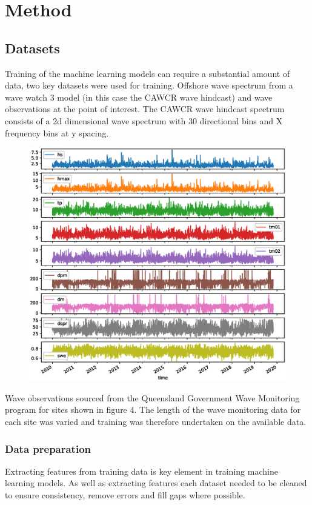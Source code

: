 \documentclass[a4paper,fleqn]{cas-sc}
\begin{document}
\section{Method}\label{method}

\subsection{Datasets}
Training of the machine learning models can require a substantial amount of data, two key datasets were used for training. Offshore wave spectrum from a wave watch 3 model (in this case the CAWCR wave hindcast) and wave observations at the point of interest. The CAWCR wave hindcast spectrum consists of a 2d dimensional wave spectrum with 30 directional bins and X frequency bins at y spacing.

\begin{figure}
	\centering
		\includegraphics{"offshore_modelled.eps"}
	  \caption{}\label{fig1}
\end{figure}

Wave observations sourced from the Queensland Government Wave Monitoring program for sites shown in figure 4. The length of the wave monitoring data for each site was varied and training was therefore undertaken on the available data.

\subsubsection{Data preparation}
Extracting features from training data is key element in training machine learning models. As well as extracting features each dataset needed to be cleaned to ensure consistency, remove errors and fill gaps where possible. 
\end{document}
